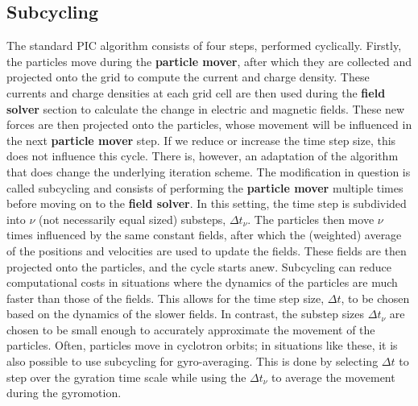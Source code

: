 \subsection{Subcycling}
\label{sub: subcycling}

The standard PIC algorithm consists of four steps, performed cyclically. Firstly, the particles move during the \textbf{particle mover}, after which they are collected and projected onto the grid to compute the current and charge density. These currents and charge densities at each grid cell are then used during the \textbf{field solver} section to calculate the change in electric and magnetic fields. These new forces are then projected onto the particles, whose movement will be influenced in the next \textbf{particle mover} step. If we reduce or increase the time step size, this does not influence this cycle. There is, however, an adaptation of the algorithm that does change the underlying iteration scheme. The modification in question is called subcycling and consists of performing the \textbf{particle mover} multiple times before moving on to the \textbf{field solver}. In this setting, the time step is subdivided into $\nu$ (not necessarily equal sized) substeps, $\Delta t_\nu$. The particles then move $\nu$ times influenced by the same constant fields, after which the (weighted) average of the positions and velocities are used to update the fields. These fields are then projected onto the particles, and the cycle starts anew. Subcycling can reduce computational costs in situations where the dynamics of the particles are much faster than those of the fields. This allows for the time step size, $\Delta t$, to be chosen based on the dynamics of the slower fields. In contrast, the substep sizes $\Delta t_\nu$ are chosen to be small enough to accurately approximate the movement of the particles. Often, particles move in cyclotron orbits; in situations like these, it is also possible to use subcycling for gyro-averaging. This is done by selecting $\Delta t$ to step over the gyration time scale while using the $\Delta t_\nu$ to average the movement during the gyromotion.

